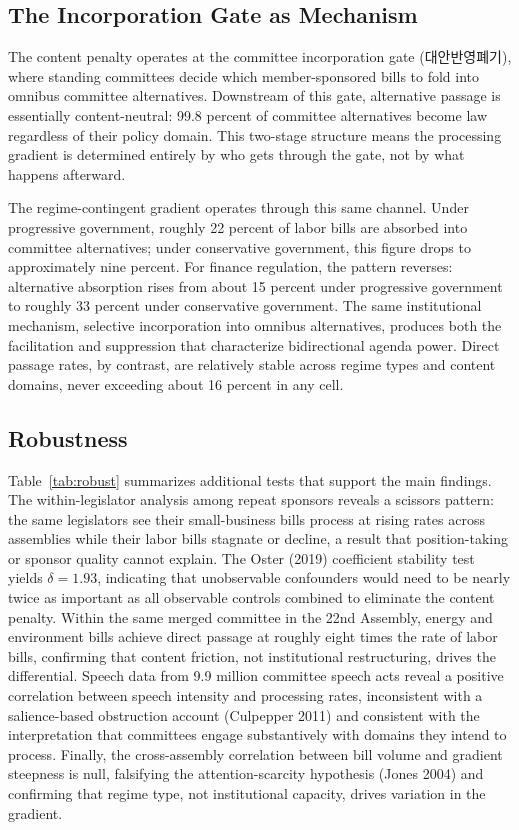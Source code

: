 \documentclass[11pt]{article}
\begin{document}
\subsection{The Incorporation Gate as Mechanism}

The content penalty operates at the committee incorporation gate (대안반영폐기), where standing committees decide which member-sponsored bills to fold into omnibus committee alternatives. Downstream of this gate, alternative passage is essentially content-neutral: 99.8 percent of committee alternatives become law regardless of their policy domain. This two-stage structure means the processing gradient is determined entirely by who gets through the gate, not by what happens afterward.

The regime-contingent gradient operates through this same channel. Under progressive government, roughly 22 percent of labor bills are absorbed into committee alternatives; under conservative government, this figure drops to approximately nine percent. For finance regulation, the pattern reverses: alternative absorption rises from about 15 percent under progressive government to roughly 33 percent under conservative government. The same institutional mechanism, selective incorporation into omnibus alternatives, produces both the facilitation and suppression that characterize bidirectional agenda power. Direct passage rates, by contrast, are relatively stable across regime types and content domains, never exceeding about 16 percent in any cell.

\subsection{Robustness}

Table~\ref{tab:robust} summarizes additional tests that support the main findings. The within-legislator analysis among repeat sponsors reveals a scissors pattern: the same legislators see their small-business bills process at rising rates across assemblies while their labor bills stagnate or decline, a result that position-taking or sponsor quality cannot explain. The Oster (2019) coefficient stability test yields $\delta = 1.93$, indicating that unobservable confounders would need to be nearly twice as important as all observable controls combined to eliminate the content penalty. Within the same merged committee in the 22nd Assembly, energy and environment bills achieve direct passage at roughly eight times the rate of labor bills, confirming that content friction, not institutional restructuring, drives the differential. Speech data from 9.9 million committee speech acts reveal a positive correlation between speech intensity and processing rates, inconsistent with a salience-based obstruction account (Culpepper 2011) and consistent with the interpretation that committees engage substantively with domains they intend to process. Finally, the cross-assembly correlation between bill volume and gradient steepness is null, falsifying the attention-scarcity hypothesis (Jones 2004) and confirming that regime type, not institutional capacity, drives variation in the gradient.
\end{document}
